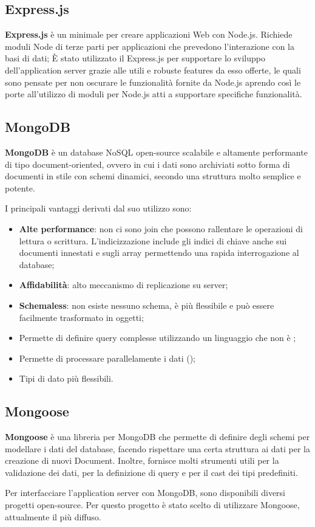 \subsection{Express.js}
\textbf{Express.js} è un  minimale per creare applicazioni Web con Node.js. Richiede moduli Node di terze parti per applicazioni che prevedono l’interazione con la basi di dati; \newline
\`E stato utilizzato il  Express.js per supportare lo sviluppo dell'application server grazie alle utili e robuste features da esso offerte, le quali sono pensate per non oscurare le funzionalità fornite da Node.js aprendo così le porte all'utilizzo di moduli per Node.js atti a supportare specifiche funzionalità.

\subsection{MongoDB}
\textbf{MongoDB} è un database NoSQL open-source scalabile e altamente performante di tipo document-oriented, ovvero in cui i dati sono archiviati sotto forma di documenti in stile  con schemi dinamici, secondo una struttura molto semplice e potente.

I principali vantaggi derivati dal suo utilizzo sono:
\begin{itemize}
	\item \textbf{Alte performance}: non ci sono join che possono rallentare le operazioni di lettura o scrittura. L’indicizzazione include gli indici di chiave anche sui documenti innestati e sugli array permettendo una rapida interrogazione al database;
	\item \textbf{Affidabilità}: alto meccanismo di replicazione su server;
	\item \textbf{Schemaless}: non esiste nessuno schema, è più flessibile e può essere facilmente trasformato in oggetti;	
	\item Permette di definire query complesse utilizzando un linguaggio che non è ;
	\item Permette di processare parallelamente i dati ();
	\item Tipi di dato più flessibili.
\end{itemize}

\subsection{Mongoose}
\textbf{Mongoose} è una libreria per MongoDB che permette di definire degli schemi per modellare i dati del database, facendo rispettare una certa struttura ai dati per la creazione di nuovi Document. Inoltre, fornisce molti strumenti utili per la validazione dei dati, per la definizione di query e per il cast dei tipi predefiniti.

Per interfacciare l'application server con MongoDB, sono disponibili diversi progetti open-source. Per questo progetto è stato scelto di utilizzare Mongoose, attualmente il più diffuso.